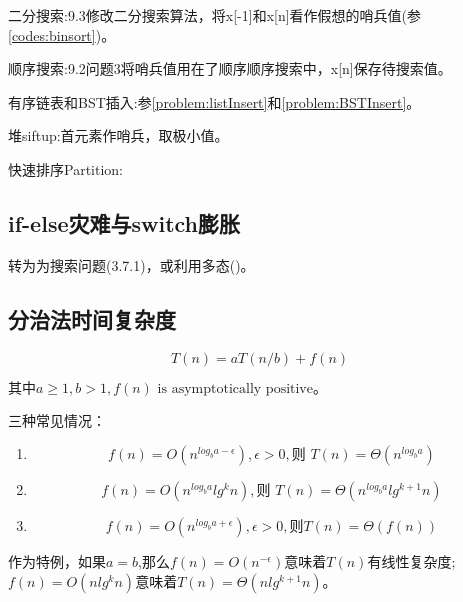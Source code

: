 二分搜索:\cite{pp}9.3修改二分搜索算法，将x[-1]和x[n]看作假想的哨兵值(参\ref{codes:binsort})。

顺序搜索:\cite{pp}9.2问题3将哨兵值用在了顺序顺序搜索中，x[n]保存待搜索值。

有序链表和BST插入:参\ref{problem:listInsert}和\ref{problem:BSTInsert}。

堆siftup:首元素作哨兵，取极小值。

快速排序Partition:



\subsection{if-else灾难与switch膨胀}
转为为搜索问题(\cite{pp}3.7.1)，或利用多态(\cite{refractor})。

\subsection{分治法时间复杂度}\label{DivideComplex}
\begin{displaymath}
    T(n)=aT(n/b)+f(n)
\end{displaymath}

\begin{math}
    \textrm{其中} a \ge 1, b > 1, f(n) \textrm{ is asymptotically positive}。
\end{math}

三种常见情况：
\begin{enumerate}
    \item 
\begin{displaymath}
    f(n)=O(n^{log_{b}a-\epsilon}), \epsilon>0, \textrm{则 }T(n)=\Theta(n^{log_{b}a})
\end{displaymath}

    \item 
\begin{displaymath}
    f(n)=O(n^{log_{b}a}lg^{k}n), \textrm{则 }T(n)=\Theta(n^{log_{b}a}lg^{k+1}n)
\end{displaymath}

    \item 
\begin{displaymath}
    f(n)=O(n^{log_{b}a+\epsilon}), \epsilon>0, \textrm{则}T(n)=\Theta(f(n))
\end{displaymath}

\end{enumerate}



作为特例，如果$a=b$,那么$f(n)=O(n^{-\epsilon})$意味着$T(n)$有线性复杂度;$f(n)=O(nlg^{k}n)$意味着$T(n)=\Theta(nlg^{k+1}n)$。














